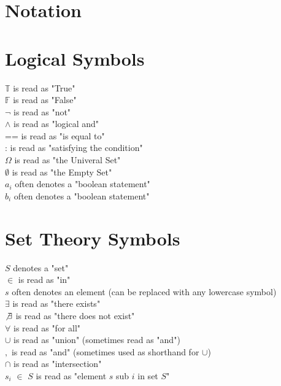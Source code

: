 \documentclass[11pt]{article}
\begin{document}
\section*{Notation}







\section*{Logical Symbols}
$\mathbb{T}$ is read as "True"\\
$\mathbb{F}$ is read as "False"\\
$\lnot$ is read as "not"\\
$\land$ is read as "logical and"\\
== is read as "is equal to"\\
: is read as "satisfying the condition"\\
$\Omega$ is read as "the Univeral Set"\\
$\emptyset$ is read as "the Empty Set"\\
$a_i$ often denotes a "boolean statement"\\
$b_i$ often denotes a "boolean statement"\\







\section*{Set Theory Symbols}
$S$ denotes a "set"\\
$\in$ is read as "in"\\
$s$ often denotes an element (can be replaced with any lowercase symbol)\\
$\exists$ is read as "there exists"\\
$\not \exists$ is read as "there does not exist"\\
$\forall$ is read as "for all"\\
$\cup$ is read as "union" (sometimes read as "and")\\
$,$ \hspace{.5mm} is read as "and" (sometimes used as shorthand for $\cup$)\\
$\cap$ is read as "intersection"\\
$s_i$ $\in$ $S$ is read as "element $s$ sub $i$ in set $S$"\\
\end{document}
